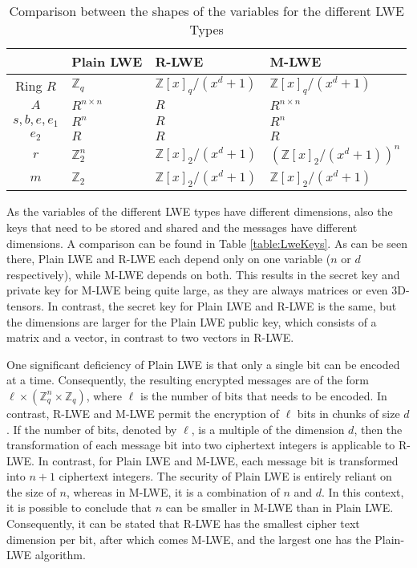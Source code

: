 \begin{table}[htbp]
  \caption[LWE variables shape comparison]{Comparison between the shapes of the variables for the different LWE Types}
  \label{table:LweDiffs}
  \centering
  \begin{tabular}{|c|l|l|l|}
    \hline
                & Plain LWE        & R-LWE                     & M-LWE                         \\
    \hline
    Ring $R$    & $\mathbb{Z}_q$   & $\mathbb{Z}[x]_q/(x^d+1)$ & $\mathbb{Z}[x]_q/(x^d+1)$     \\
    $A$         & $R^{n\times n}$  & $R$                       & $R^{n\times n}$               \\
    $s,b,e,e_1$ & $R^{n}$          & $R$                       & $R^{n}$                       \\
    $e_2$       & $R$              & $R$                       & $R$                           \\
    $r$         & $\mathbb{Z}_2^n$ & $\mathbb{Z}[x]_2/(x^d+1)$ & $(\mathbb{Z}[x]_2/(x^d+1))^n$ \\
    $m$         & $\mathbb{Z}_2$   & $\mathbb{Z}[x]_2/(x^d+1)$ & $\mathbb{Z}[x]_2/(x^d+1)$     \\
    \hline
  \end{tabular}
\end{table}

As the variables of the different LWE types have different dimensions, also the keys that need to be stored and shared and the messages have different dimensions. A comparison can be found in Table \ref{table:LweKeys}. As can be seen there, Plain LWE and R-LWE each depend only on one variable ($n$ or $d$ respectively), while M-LWE depends on both. This results in the secret key and private key for M-LWE being quite large, as they are always matrices or even 3D-tensors. In contrast, the secret key for Plain LWE and R-LWE is the same, but the dimensions are larger for the Plain LWE public key, which consists of a matrix and a vector, in contrast to two vectors in R-LWE.

One significant deficiency of Plain LWE is that only a single bit can be encoded at a time. Consequently, the resulting encrypted messages are of the form $\ell \times (\mathbb{Z}_q^{n}\times\mathbb{Z}_q)$, where $\ell$ is the number of bits that needs to be encoded. In contrast, R-LWE and M-LWE permit the encryption of $\ell$ bits in chunks of size $d$. If the number of bits, denoted by $\ell$, is a multiple of the dimension $d$, then the transformation of each message bit into two ciphertext integers is applicable to R-LWE. In contrast, for Plain LWE and M-LWE, each message bit is transformed into $n+1$ ciphertext integers.  
The security of Plain LWE is entirely reliant on the size of $n$, whereas in M-LWE, it is a combination of $n$ and $d$. In this context, it is possible to conclude that $n$ can be smaller in M-LWE than in Plain LWE. Consequently, it can be stated that R-LWE has the smallest cipher text dimension per bit, after which comes M-LWE, and the largest one has the Plain-LWE algorithm.

